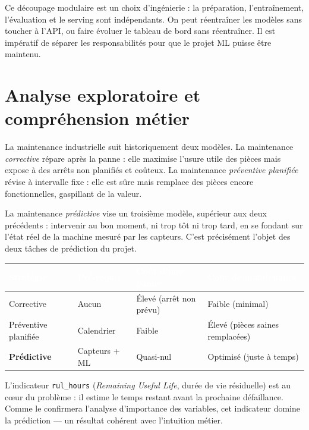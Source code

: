 \documentclass[11pt]{article}
\newcommand{\thead}[1]{\textbf{\textcolor{white}{#1}}}
\begin{document}
Ce découpage modulaire est un choix d'ingénierie : la préparation, l'entraînement,
l'évaluation et le serving sont indépendants. On peut réentraîner les modèles sans
toucher à l'API, ou faire évoluer le tableau de bord sans réentraîner. Il est 
impératif de séparer les responsabilités pour que le projet ML puisse être maintenu.

\section{Analyse exploratoire et compréhension métier}

La maintenance industrielle suit historiquement deux modèles. La maintenance
\textit{corrective} répare après la panne : elle maximise l'usure utile des pièces
mais expose à des arrêts non planifiés et coûteux. La maintenance \textit{préventive
planifiée} révise à intervalle fixe : elle est sûre mais remplace des pièces encore
fonctionnelles, gaspillant de la valeur.

La maintenance \textit{prédictive} vise un troisième modèle, supérieur aux deux
précédents : intervenir au bon moment, ni trop tôt ni trop tard, en se fondant sur
l'état réel de la machine mesuré par les capteurs. C'est précisément l'objet des
deux tâches de prédiction du projet.

\begin{center}
\begin{tabularx}{\linewidth}{|l|l|>{\raggedright\arraybackslash}X|>{\raggedright\arraybackslash}X|}
\hline
\rowcolor{tableHeader}
\thead{Stratégie} & \thead{Pré-requis} & \thead{Coût d'une panne} & \thead{Coût de maintenance} \\
\hline
Corrective & Aucun & Élevé (arrêt non prévu) & Faible (minimal) \\
\hline
Préventive planifiée & Calendrier & Faible & Élevé (pièces saines remplacées) \\
\hline
\textbf{Prédictive} & Capteurs + ML & Quasi-nul & Optimisé (juste à temps) \\
\hline
\end{tabularx}
\end{center}

L'indicateur \texttt{rul\_hours} (\textit{Remaining Useful Life}, durée de vie
résiduelle) est au cœur du problème : il estime le temps restant avant la prochaine
défaillance. Comme le confirmera l'analyse d'importance des variables, cet indicateur
domine la prédiction --- un résultat cohérent avec l'intuition métier.
\end{document}
